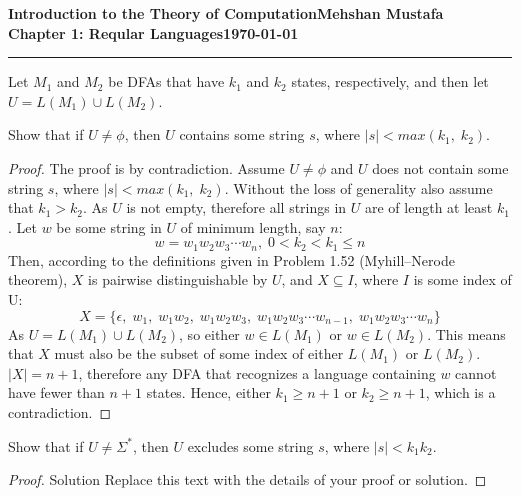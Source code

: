 \documentclass[11pt]{article}
\newcommand{\myname}{Mehshan Mustafa}
\newcommand{\dated}{\today}
\newenvironment{problem}[2][Problem]{\begin{trivlist}
\item[\hskip \labelsep {\bfseries #1}\hskip \labelsep {\bfseries #2.}]}{\end{trivlist}}
\begin{document}
\textbf{Introduction to the Theory of
Computation}\hfill\textbf{\myname}\\[0.01in]
\textbf{Chapter 1: Reqular Languages}\hfill\textbf{\dated}\\
\smallskip\hrule\bigskip

\begin{problem}{1.72}
Let $M_{1}$ and $M_{2}$ be DFAs that have $k_{1}$ and $k_{2}$ states, respectively, and then let $U = L(M_{1}) \cup L(M_{2})$.
\end{problem}

\begin{problem}[Part]{a}
Show that if $U \neq \phi$, then $U$ contains some string $s$, where $|s| < max(k_{1}, \; k_{2})$.
\end{problem}

\begin{proof}
The proof is by contradiction. Assume $U \neq \phi$ and $U$ does not contain some string $s$, where $|s| < max(k_{1}, \; k_{2})$. Without the loss of generality also assume that $k_{1} > k_{2}$. As $U$ is not empty, therefore all strings in $U$ are of length at least $k_{1}$. Let $w$ be some string in $U$ of minimum length, say $n$:
\[ w = w_{1}w_{2}w_{3} \cdots w_{n}, \; 0 < k_{2} < k_{1} \leq n\]
Then, according to the definitions given in Problem 1.52 (Myhill–Nerode theorem), $X$ is pairwise distinguishable by $U$, and $X \subseteq I$, where $I$ is some index of U:
\[ X = \{ \epsilon, \; w_{1}, \; w_{1}w_{2}, \; w_{1}w_{2}w_{3}, \; w_{1}w_{2}w_{3}\cdots w_{n - 1}, \;  w_{1}w_{2}w_{3}\cdots w_{n} \} \]
As $U = L(M_{1}) \cup L(M_{2})$, so either $w \in L(M_{1})$ or $w \in L(M_{2})$. This means that $X$ must also be the subset of some index of either $L(M_{1})$ or $L(M_{2})$. $|X| = n + 1$, therefore any DFA that recognizes a language containing $w$ cannot have fewer than $n + 1$ states. Hence, either $k_{1} \geq n + 1$ or $k_{2} \geq n + 1$, which is a contradiction.
\end{proof}

\begin{problem}[Part]{b}
Show that if $U \neq \Sigma^*$, then $U$ excludes some string $s$, where $|s| < k_{1}k_{2}$.
\end{problem}

\begin{proof}
Solution Replace this text with the details of your proof or solution.
\end{proof}
\end{document}
